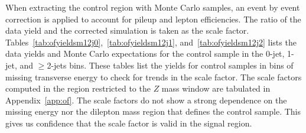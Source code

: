 When extracting the control region with Monte Carlo samples, an event by event correction is applied to
account for pileup and lepton efficiencies. The ratio of the data yield and the corrected simulation is taken as the scale
factor. Tables~\ref{tab:ofyieldsm12j0},~\ref{tab:ofyieldsm12j1}, and~\ref{tab:ofyieldsm12j2} lists the data yields and Monte Carlo
expectations for the control sample in the 0-jet, 1-jet, and $\geq$2-jets bins. These tables list the yields for control samples
in bins of missing transverse energy to check for trends in the scale factor. The scale factors computed in the region restricted
to the $Z$ mass window are tabulated in Appendix~\ref{app:of}. The scale factors do not show a strong dependence on the missing energy nor the
dilepton mass region that defines the control sample. This gives us confidence that the scale factor is valid in the signal region.


